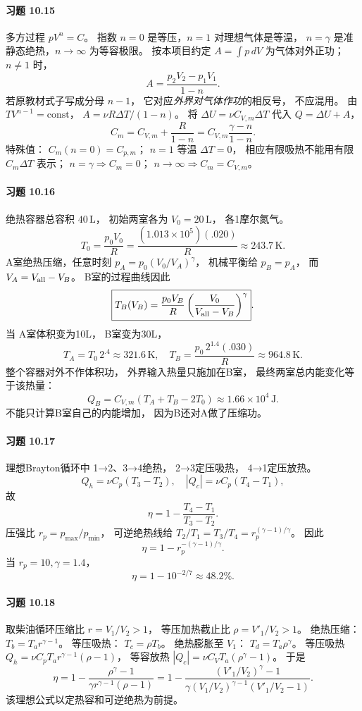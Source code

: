 \paragraph{习题 10.15}
多方过程 \(pV^n=C\)。
指数 \(n=0\) 是等压，\(n=1\) 对理想气体是等温，
\(n=\gamma\) 是准静态绝热，\(n\to\infty\) 为等容极限。
按本项目约定 \(A=\int p\,dV\) 为气体对外正功；
\(n\ne1\) 时，
\[
 \boxed{A=\frac{p_2V_2-p_1V_1}{1-n}}.
\]
若原教材式子写成分母 \(n-1\)，
它对应\emph{外界对气体作功}的相反号，
不应混用。
由 \(TV^{n-1}=\mathrm{const}\)，
\(A=\nu R\Delta T/(1-n)\)。
将 \(\Delta U=\nu C_{V,m}\Delta T\)
代入 \(Q=\Delta U+A\)，
\[
 \boxed{C_m=C_{V,m}+\frac R{1-n}
 =C_{V,m}\frac{\gamma-n}{1-n}}.
\]
特殊值：
\(C_m(n=0)=C_{p,m}\)；
\(n=1\) 等温 \(\Delta T=0\)，
相应有限吸热不能用有限 \(C_m\Delta T\) 表示；
\(n=\gamma\Rightarrow C_m=0\)；
\(n\to\infty\Rightarrow C_m=C_{V,m}\)。

\paragraph{习题 10.16}
绝热容器总容积 \(40\,\mathrm L\)，
初始两室各为 \(V_0=20\,\mathrm L\)，
各1摩尔氮气。
\[
 T_0=\frac{p_0V_0}R
 =\frac{(1.013\times10^5)(.020)}R
 \approx243.7\,\mathrm K.
\]
A室绝热压缩，任意时刻
\(p_A=p_0(V_0/V_A)^\gamma\)，
机械平衡给 \(p_B=p_A\)，
而 \(V_A=V_{\rm all}-V_B\)。
B室的过程曲线因此
\[
 \boxed{T_B(V_B)=
 \frac{p_0V_B}R
 \left(\frac{V_0}{V_{\rm all}-V_B}\right)^\gamma}.
\]
当 A室体积变为10L，
B室变为30L，
\[
 \boxed{T_A=T_0\,2^{.4}\approx321.6\,\mathrm K},
 \quad
 \boxed{T_B=\frac{p_0\,2^{1.4}(.030)}R
 \approx964.8\,\mathrm K}.
\]
整个容器对外不作体积功，
外界输入热量只施加在B室，
最终两室总内能变化等于该热量：
\[
 \boxed{Q_B=C_{V,m}(T_A+T_B-2T_0)
 \approx1.66\times10^4\,\mathrm J}.
\]
不能只计算B室自己的内能增加，
因为B还对A做了压缩功。

\paragraph{习题 10.17}
理想Brayton循环中
1→2、3→4绝热，
2→3定压吸热，
4→1定压放热。
\[
 Q_h=\nu C_p(T_3-T_2),\quad
 |Q_c|=\nu C_p(T_4-T_1),
\]
故
\[
 \boxed{\eta=1-\frac{T_4-T_1}{T_3-T_2}}.
\]
压强比 \(r_p=p_{\max}/p_{\min}\)，
可逆绝热线给
\(T_2/T_1=T_3/T_4=r_p^{(\gamma-1)/\gamma}\)。
因此
\[
 \boxed{\eta=1-r_p^{-(\gamma-1)/\gamma}}.
\]
当 \(r_p=10,\gamma=1.4\)，
\[
 \boxed{\eta=1-10^{-2/7}\approx48.2\%}.
\]

\paragraph{习题 10.18}
取柴油循环压缩比
\(r=V_1/V_2>1\)，
等压加热截止比
\(\rho=V'_1/V_2>1\)。
绝热压缩：
\(T_b=T_a r^{\gamma-1}\)。
等压吸热：
\(T_c=\rho T_b\)。
绝热膨胀至 \(V_1\)：
\(T_d=T_a\rho^\gamma\)。
等压吸热
\(Q_h=\nu C_pT_a r^{\gamma-1}(\rho-1)\)，
等容放热
\(|Q_c|=\nu C_VT_a(\rho^\gamma-1)\)。
于是
\[
 \boxed{\eta=1-\frac{\rho^\gamma-1}
 {\gamma r^{\gamma-1}(\rho-1)}
 =1-\frac{(V'_1/V_2)^\gamma-1}
 {\gamma(V_1/V_2)^{\gamma-1}(V'_1/V_2-1)}}.
\]
该理想公式以定热容和可逆绝热为前提。

